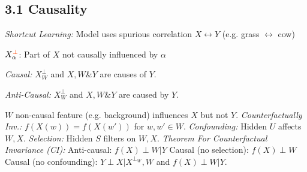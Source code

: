 \subsection{3.1 Causality}

\emph{Shortcut Learning:} Model uses spurious correlation $X \leftrightarrow Y$ (e.g. grass $\leftrightarrow$ cow)

$X_{\alpha}^{\begingroup\color{OrangeRed}{\perp}\endgroup}$: Part of $X$ {\color{OrangeRed} not} causally influenced by $\alpha$

\emph{Causal:} $X_W^{\perp}$ and $X,W \& Y$ are causes of $Y$.

\emph{Anti-Causal:} $X_W^{\perp}$ and $X,W \& Y$ are caused by $Y$.

$W$ non-causal feature (e.g. background) influences $X$ but not $Y$. \emph{Counterfactually Inv.:} $f(X(w)) = f(X(w'))$ for $w,w' \in W$. \emph{Confounding:} Hidden $U$ affects $W,X$. \emph{Selection:} Hidden $S$ filters on $W,X$. \emph{Theorem For Counterfactual Invariance (CI):} Anti-causal: $f(X) \perp W | Y$ Causal (no selection): $f(X) \perp W$ Causal (no confounding): $Y \perp X | X^{\perp_W}, W$ and $f(X) \perp W | Y$.

